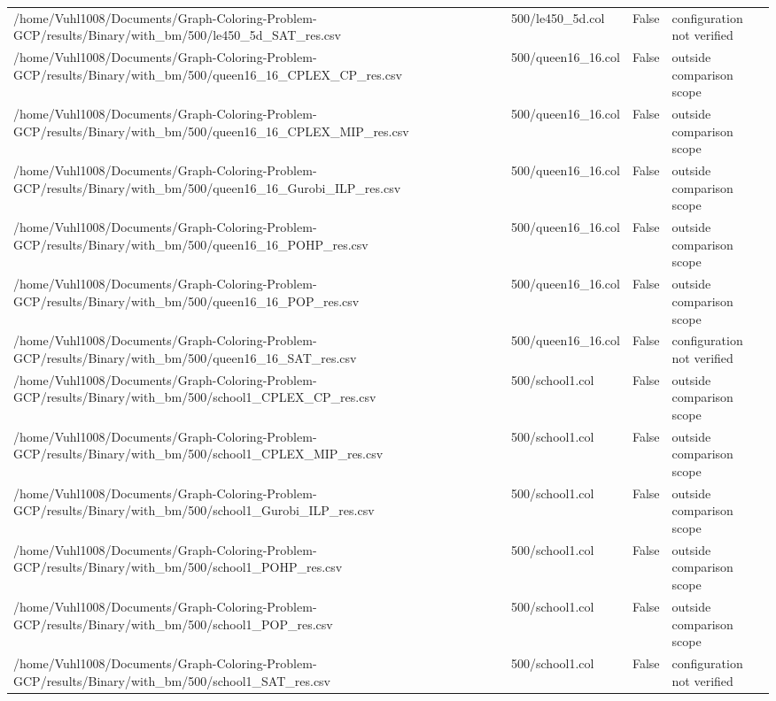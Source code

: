 \begin{table}[htbp]
\begin{tabular}{llll}
/home/Vuhl1008/Documents/Graph-Coloring-Problem-GCP/results/Binary/with\_bm/500/le450\_5d\_SAT\_res.csv & 500/le450\_5d.col & False & configuration not verified \\
/home/Vuhl1008/Documents/Graph-Coloring-Problem-GCP/results/Binary/with\_bm/500/queen16\_16\_CPLEX\_CP\_res.csv & 500/queen16\_16.col & False & outside comparison scope \\
/home/Vuhl1008/Documents/Graph-Coloring-Problem-GCP/results/Binary/with\_bm/500/queen16\_16\_CPLEX\_MIP\_res.csv & 500/queen16\_16.col & False & outside comparison scope \\
/home/Vuhl1008/Documents/Graph-Coloring-Problem-GCP/results/Binary/with\_bm/500/queen16\_16\_Gurobi\_ILP\_res.csv & 500/queen16\_16.col & False & outside comparison scope \\
/home/Vuhl1008/Documents/Graph-Coloring-Problem-GCP/results/Binary/with\_bm/500/queen16\_16\_POHP\_res.csv & 500/queen16\_16.col & False & outside comparison scope \\
/home/Vuhl1008/Documents/Graph-Coloring-Problem-GCP/results/Binary/with\_bm/500/queen16\_16\_POP\_res.csv & 500/queen16\_16.col & False & outside comparison scope \\
/home/Vuhl1008/Documents/Graph-Coloring-Problem-GCP/results/Binary/with\_bm/500/queen16\_16\_SAT\_res.csv & 500/queen16\_16.col & False & configuration not verified \\
/home/Vuhl1008/Documents/Graph-Coloring-Problem-GCP/results/Binary/with\_bm/500/school1\_CPLEX\_CP\_res.csv & 500/school1.col & False & outside comparison scope \\
/home/Vuhl1008/Documents/Graph-Coloring-Problem-GCP/results/Binary/with\_bm/500/school1\_CPLEX\_MIP\_res.csv & 500/school1.col & False & outside comparison scope \\
/home/Vuhl1008/Documents/Graph-Coloring-Problem-GCP/results/Binary/with\_bm/500/school1\_Gurobi\_ILP\_res.csv & 500/school1.col & False & outside comparison scope \\
/home/Vuhl1008/Documents/Graph-Coloring-Problem-GCP/results/Binary/with\_bm/500/school1\_POHP\_res.csv & 500/school1.col & False & outside comparison scope \\
/home/Vuhl1008/Documents/Graph-Coloring-Problem-GCP/results/Binary/with\_bm/500/school1\_POP\_res.csv & 500/school1.col & False & outside comparison scope \\
/home/Vuhl1008/Documents/Graph-Coloring-Problem-GCP/results/Binary/with\_bm/500/school1\_SAT\_res.csv & 500/school1.col & False & configuration not verified \\

\end{tabular}
\end{table}
